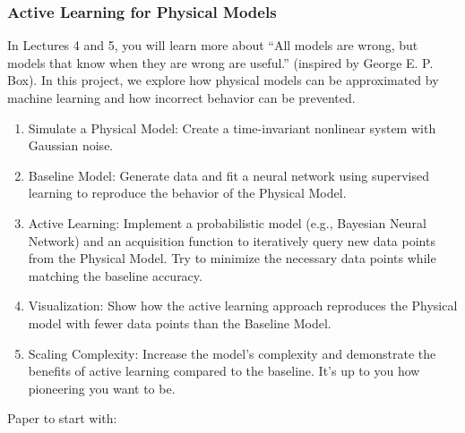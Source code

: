 \documentclass[a4paper]{article}
\begin{document}
\subsubsection{Active Learning for Physical Models}
In Lectures 4 and 5, you will learn more about “All models are wrong, but models that know when they are wrong are useful.” (inspired by George E. P. Box). In this project, we explore how physical models can be approximated by machine learning and how incorrect behavior can be prevented.
\begin{enumerate}
  \item Simulate a Physical Model: Create a time-invariant nonlinear system with Gaussian noise.
  \item Baseline Model: Generate data and fit a neural network using supervised learning to reproduce the behavior of the Physical Model.
  \item Active Learning: Implement a probabilistic model (e.g., Bayesian Neural Network) and an acquisition function to iteratively query new data points from the Physical Model. Try to minimize the necessary data points while matching the baseline accuracy.
  \item Visualization: Show how the active learning approach reproduces the Physical model with fewer data points than the Baseline Model.
  \item Scaling Complexity: Increase the model’s complexity and demonstrate the benefits of active learning compared to the baseline. It's up to you how pioneering you want to be.
\end{enumerate}
Paper to start with: \citet{Tang2023ActivelyLD}

\end{document}
